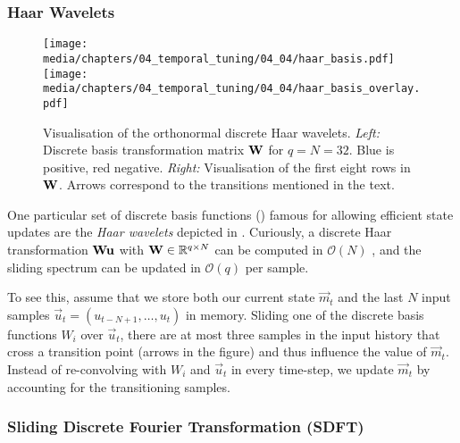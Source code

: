 \subsubsection{Haar Wavelets}

\begin{figure}
	\centering
	\texttt{[image: media/chapters/04\_temporal\_tuning/04\_04/haar\_basis.pdf]}%
	\kern-156.73mm\texttt{[image: media/chapters/04\_temporal\_tuning/04\_04/haar\_basis\_overlay.pdf]}%
	\caption[Visualisation of the orthonormal discrete Haar wavelets]{Visualisation of the orthonormal discrete Haar wavelets.
	\emph{Left:} Discrete basis transformation matrix $\mathbf{W}$ for $q = N = 32$. Blue is positive, red negative.
	\emph{Right:} Visualisation of the first eight rows in $\mathbf{W}$.
	Arrows correspond to the transitions mentioned in the text.
	}
	\label{fig:haar_basis}
\end{figure}

One particular set of discrete basis functions () famous for allowing efficient state updates are the \emph{Haar wavelets} depicted in  \citep{haar1910zur}.
Curiously, a discrete Haar transformation $\mathbf{W} \mathbf{u}$ with $\mathbf{W} \in \mathbb{R}^{q \times N}$ can be computed in $\mathcal{O}(N)$ \citep{kaiser1998fast}, and the sliding spectrum can be updated in $\mathcal{O}(q)$ per sample.

To see this, assume that we store both our current state $\vec m_t$ and the last $N$ input samples $\vec u_t = (u_{t - N + 1}, \ldots, u_{t})$ in memory.
Sliding one of the discrete basis functions $W_i$ over $\vec u_t$, there are at most three samples in the input history that cross a transition point (arrows in the figure) and thus influence the value of $\vec m_t$.
Instead of re-convolving with $W_i$ and $\vec u_t$ in every time-step, we update $\vec m_t$ by accounting for the transitioning samples.

\subsubsection{Sliding Discrete Fourier Transformation (SDFT)}

